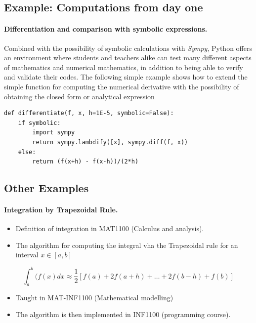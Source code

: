 \documentclass[%
twoside,                 %
final,                   %
10pt]{article}
\begin{document}
\subsection*{Example: Computations from day one}

\paragraph{Differentiation and comparison with symbolic expressions.}
Combined with the possibility of symbolic calculations with \emph{Sympy}, Python offers an environment where students and teachers alike can test many different aspects of mathematics and numerical mathematics, in addition to being able to verify and validate their codes. The following simple example shows how to extend the simple function for computing the numerical derivative with the possibility of obtaining the closed form or analytical expression
\begin{verbatim}
def differentiate(f, x, h=1E-5, symbolic=False):
    if symbolic:
        import sympy
        return sympy.lambdify([x], sympy.diff(f, x))
    else:
        return (f(x+h) - f(x-h))/(2*h)
\end{verbatim}





\subsection*{Other Examples}

\paragraph{Integration by Trapezoidal Rule.}

\begin{itemize}
\item Definition of integration  in MAT1100 (Calculus and analysis).

\item The algorithm for computing the  integral vha the Trapezoidal rule for an interval $x \in [a,b]$
\end{itemize}

\noindent
\[
  \int_a^b(f(x) dx \approx \frac{1}{2}\left [f(a)+2f(a+h)+\dots+2f(b-h)+f(b)\right] 
\]
\begin{itemize}
\item Taught   in MAT-INF1100  (Mathematical modelling)

\item The algorithm is then implemented in  INF1100 (programming course).
\end{itemize}
\end{document}
